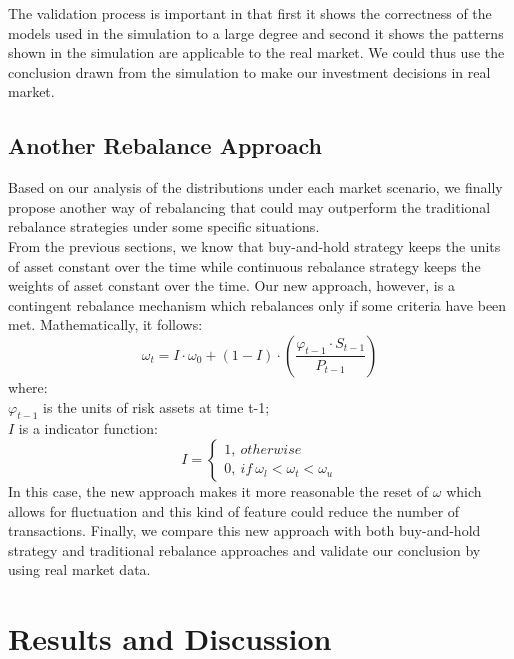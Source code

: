 \documentclass[
10pt, %
a4paper, %
oneside, %
headinclude,footinclude, %
BCOR5mm, %
]{scrartcl}
\begin{document}
The validation process is important in that first it shows the correctness of the models used in the simulation to a large degree and second it shows the patterns shown in the simulation are applicable to the real market. We could thus use the conclusion drawn from the simulation to make our investment decisions in real market.\\
\subsection{Another Rebalance Approach}
Based on our analysis of the distributions under each market scenario, we finally propose another way of rebalancing that could may outperform the traditional rebalance strategies under some specific situations.\\

From the previous sections, we know that buy-and-hold strategy keeps the units of asset constant over the time while continuous rebalance strategy keeps the weights of asset constant over the time. Our new approach, however, is a contingent rebalance mechanism which rebalances only if some criteria have been met. Mathematically, it follows:
$$\omega_t = I\cdot\omega_0 + (1-I)\cdot(\frac{\varphi_{t-1} \cdot S_{t-1} }{P_{t-1}})$$
where: \\

$\varphi_{t-1}$ is the units of risk assets at time t-1;\\

$I$ is a indicator function:
$$I = \left\{\begin{array}{ll}
1,\ otherwise \\

0,\ if\ \omega_l<\omega_t<\omega_u
\end{array}
\right.$$
In this case, the new approach makes it more reasonable the reset of $\omega$ which allows for fluctuation and this kind of feature could reduce the number of transactions. Finally, we compare this new approach with both buy-and-hold strategy and traditional rebalance approaches and validate our conclusion by using real market data.



\section{Results and Discussion}
\end{document}
